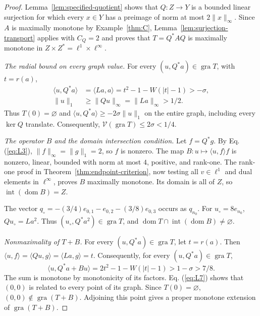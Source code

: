 \documentclass[11pt]{article}
\newcommand{\gra}{\operatorname{gra}}
\newcommand{\dom}{\operatorname{dom}}
\newcommand{\pair}[2]{\langle #1,#2\rangle}
\theoremstyle{definition}
\theoremstyle{remark}
\begin{document}
\begin{proof}
Lemma~\ref{lem:specified-quotient} shows that $Q:Z\to Y$ is a bounded linear surjection for which every $x\in Y$ has a preimage of norm at most $2\|x\|_\infty$. Since $A$ is maximally monotone by Example~\ref{thm:C}, Lemma~\ref{lem:surjection-transport} applies with $C_Q=2$ and proves that $T=Q^*AQ$ is maximally monotone in $Z\times Z^*=\ell^1\times\ell^\infty$.

\noindent\textit{The radial bound on every graph value.}
\label{sec:L3}
For every $(u,Q^*a)\in\gra T$, with $t=r(a)$,
\begin{equation}
\begin{aligned}
\pair{u}{Q^*a}&=\pair{La}{a}
 =t^2-1-W(|t|-1)>-\sigma,\\
\|u\|_1&\ge\|Qu\|_\infty=\|La\|_\infty>1/2.
\end{aligned}
\label{eq:L6}
\end{equation}
Thus $T(0)=\varnothing$ and $\pair{u}{Q^*a}\ge-2\sigma\|u\|_1$ on the entire graph, including every $\ker Q$ translate. Consequently, $\mathcal V(\gra T)\le2\sigma<1/4$.

\noindent\textit{The operator $B$ and the domain intersection condition.}
\label{sec:L4}
Let $f=Q^*g$. By Eq. (\ref{eq:L3}), $\|f\|_\infty=\|g\|_1=2$, so $f$ is nonzero. The map $B:u\mapsto\pair{u}{f}f$ is nonzero, linear, bounded with norm at most $4$, positive, and rank-one. The rank-one proof in Theorem~\ref{thm:endpoint-criterion}, now testing all $v\in\ell^1$ and dual elements in $\ell^\infty$, proves $B$ maximally monotone. Its domain is all of $Z$, so $\operatorname{int}(\dom B)=Z$.

The vector $q_\circ=-(3/4)e_{0,1}-e_{0,2}-(3/8)e_{0,3}$ occurs as $q_{n_0}$. For $u_\circ=8e_{n_0}$, $Qu_\circ=La^2$. Thus $(u_\circ,Q^*a^2)\in\gra T$, and $\dom T\cap\operatorname{int}(\dom B)\ne\varnothing$.

\noindent\textit{Nonmaximality of $T+B$.}
\label{sec:L5}
For every $(u,Q^*a)\in\gra T$, let $t=r(a)$. Then $\pair{u}{f}=\pair{Qu}{g}=\pair{La}{g}=t$. Consequently, for every $(u,Q^*a)\in\gra T$,
\begin{equation}
\pair{u}{Q^*a+Bu}
 =2t^2-1-W(|t|-1)>1-\sigma>7/8.
\label{eq:L7}
\end{equation}
The sum is monotone by monotonicity of its factors. Eq. (\ref{eq:L7}) shows that $(0,0)$ is related to every point of its graph. Since $T(0)=\varnothing$, $(0,0)\notin\gra(T+B)$. Adjoining this point gives a proper monotone extension of $\gra(T+B)$.
\end{proof}
\end{document}
